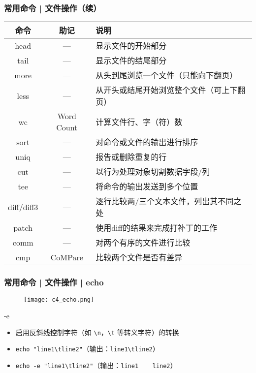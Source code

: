 \begin{frame}
  \frametitle{常用命令 | \alert{文件操作（续）}}
  \begin{table}
    \centering
    \begin{tabularx}{\textwidth}{ccX}
      \hline
      \rowcolor{blue!50}命令 & 助记 & 说明\\
      \hline
      head & --- & 显示文件的开始部分\\
      tail & --- & 显示文件的结尾部分\\
      more & --- & 从头到尾浏览一个文件（只能向下翻页）\\
      less & --- & \footnotesize{从开头或结尾开始浏览整个文件（可上下翻页）}\\
      wc & Word Count & 计算文件行、字（符）数\\
      sort & --- & 对命令或文件的输出进行排序\\
      uniq & --- & 报告或删除重复的行\\
      cut & --- & 以行为处理对象切割数据字段/列\\
      tee & --- & 将命令的输出发送到多个位置\\
      diff/diff3 & --- & 逐行比较两/三个文本文件，列出其不同之处\\
      patch & --- & 使用diff的结果来完成打补丁的工作\\
      comm & --- & 对两个有序的文件进行比较\\
      cmp & CoMPare & 比较两个文件是否有差异\\
      \hline
    \end{tabularx}
  \end{table}
\end{frame}

\begin{frame}[fragile]
  \frametitle{常用命令 | 文件操作 | echo}
  \begin{figure}
    \centering
    \texttt{[image: c4\_echo.png]}
  \end{figure}
  \pause
  \begin{block}{\alert{-e}}
    \begin{itemize}
      \item 启用反斜线控制字符（如 \verb|\n|，\verb|\t| 等转义字符）的转换
      \item \verb|echo "line1\tline2"|（输出：\verb|line1\tline2|）
      \item \verb|echo -e "line1\tline2"|（输出：\verb|line1    line2|）
    \end{itemize}
  \end{block}
\end{frame}

